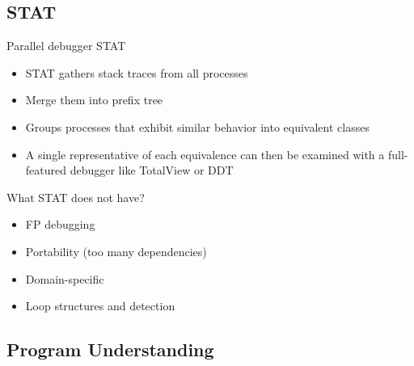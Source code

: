 \cite{diff-myers}

\clearpage

\subsection{STAT}

Parallel debugger STAT\cite{stat}
\begin{itemize}
\item STAT gathers stack traces from all processes
\item Merge them into prefix tree
\item Groups processes that exhibit similar behavior into equivalent classes
\item A single representative of each equivalence can then be examined with a full-featured debugger like TotalView or DDT
\end{itemize}

What STAT does not have?

\begin{itemize}
\item FP debugging
\item Portability (too many dependencies)
\item Domain-specific
\item Loop structures and detection
\end{itemize}
 

\subsection{Program Understanding }



